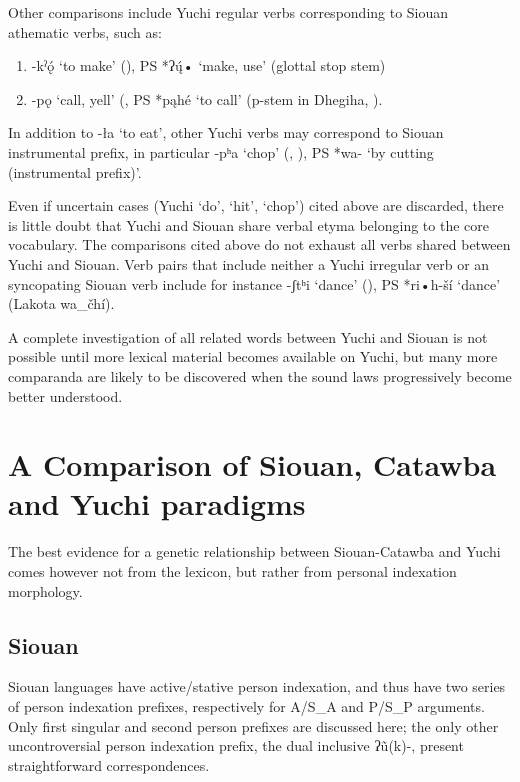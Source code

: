\documentclass[oneside,a4paper,11pt]{article}
\newcommand{\ipa}[1]{{\phon#1}} %
\begin{document}
Other comparisons include Yuchi regular verbs corresponding to Siouan athematic verbs, such as:
\begin{enumerate}
\item   \ipa{-kˀǫ́} ‘to make’ (\citealt[364]{wagner38yuchi}), PS *\ipa{*ʔų́•} ‘make, use’ (glottal stop stem)
\item \ipa{-pǫ} ‘call, yell’ (\citealt[320, 328]{wagner38yuchi}, PS *\ipa{pąhé} ‘to call’ (p-stem in Dhegiha, \citealt{rankin05quapaw}).   
\end{enumerate}  

In addition to \ipa{-ła} ‘to eat’, other Yuchi verbs may correspond to Siouan instrumental prefix, in particular  \ipa{-pʰa} `chop' (\citealt[329]{wagner38yuchi}, \citealt[176]{crawford73yuchi}), PS *\ipa{wa-} `by cutting (instrumental prefix)'.

Even if uncertain cases (Yuchi `do', `hit', `chop') cited above are discarded, there is little doubt that Yuchi and Siouan share verbal etyma belonging to the core vocabulary. The comparisons cited above do not exhaust all verbs shared between Yuchi and Siouan. Verb pairs that include neither a Yuchi irregular verb or an syncopating Siouan verb include for instance \ipa{-ʃtʰi} `dance' (\citealt[354]{wagner38yuchi}), PS *\ipa{*ri•h-ší} `dance' (Lakota \ipa{wa\_čhí}).

A complete investigation of all related words between Yuchi and Siouan is not possible until more lexical material becomes available on Yuchi, but many more comparanda are likely to be discovered when the sound laws progressively become better understood.

\section{A Comparison of Siouan, Catawba and Yuchi paradigms}
The best evidence for a genetic relationship between Siouan-Catawba and Yuchi comes however not from the lexicon, but rather from personal indexation morphology.

\subsection{Siouan}
Siouan languages have active/stative person indexation, and thus have two series of person indexation prefixes, respectively for A/S_A and P/S_P arguments. Only first singular and second person prefixes are discussed here; the only other uncontroversial person indexation prefix, the dual inclusive \ipa{*ʔũ(k)-}, present straightforward correspondences.
\end{document}
